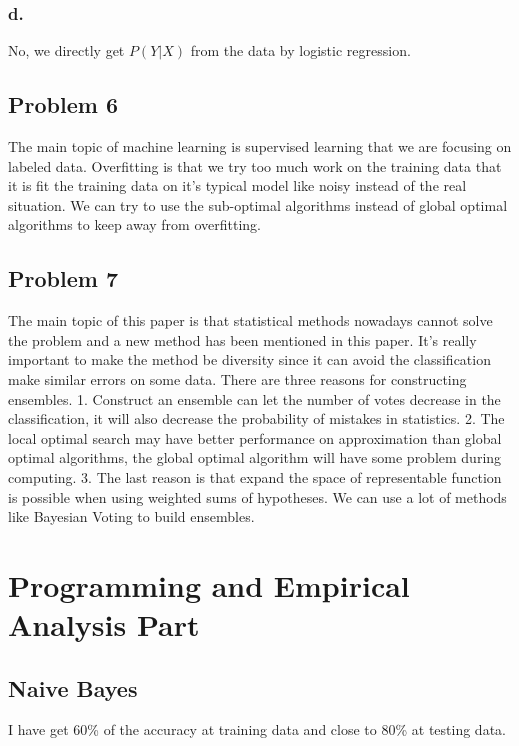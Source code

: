 \documentclass[12pt]{article}
\begin{document}
			\subsubsection{d.}
				No, we directly get $P(Y|X)$ from the data by logistic regression. 
		\subsection{Problem 6}
				The main topic of machine learning is supervised learning that we are focusing on labeled data. Overfitting is that we try too much work on the training data that it is fit the training data on it's typical model like noisy instead of the real situation. We can try to use the sub-optimal algorithms instead of global optimal algorithms to keep away from overfitting.
		\subsection{Problem 7}
			The main topic of this paper is that statistical methods nowadays cannot solve the problem and a new method has been mentioned in this paper. It's really important to make the method be diversity since it can avoid the classification make similar errors on some data. There are three reasons for constructing ensembles. 1. Construct an ensemble can let the number of votes decrease in the classification, it will also decrease the probability of mistakes in statistics. 2. The local optimal search may have better performance on approximation than global optimal algorithms, the global optimal algorithm will have some problem during computing. 3. The last reason is that expand the space of representable function is possible when using weighted sums of hypotheses. We can use a lot of methods like Bayesian Voting to build ensembles.
 	\section{Programming and Empirical Analysis Part}
		\subsection {Naive Bayes}
			I have get 60\% of the accuracy at training data and close to 80\% at testing data.
\end{document}
